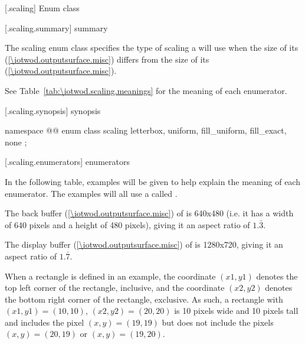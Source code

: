  [\iotwod.scaling] {Enum class }

 [\iotwod.scaling.summary] { summary}

\pnum
The scaling enum class specifies the type of scaling a  
will use when the size of its  (\ref{\iotwod.outputsurface.misc}) differs from the size of its  (\ref{\iotwod.outputsurface.misc}).

\pnum
See Table~\ref{tab:\iotwod.scaling.meanings} for the meaning of each  enumerator.

 [\iotwod.scaling.synopsis] { synopsis}

\begin{codeblock}
namespace @\fullnamespace{}@ {
  enum class scaling {
    letterbox,
    uniform,
    fill_uniform,
    fill_exact,
    none
  };
}
\end{codeblock}

 [\iotwod.scaling.enumerators] { enumerators}

\pnum
\begin{note}
In the following table, examples will be given to help explain the meaning of each enumerator. The examples will all use a  called .

The back buffer (\ref{\iotwod.outputsurface.misc}) of  is 640x480 (i.e. it has a width of 640 pixels and a height of 480 pixels), giving it an aspect ratio of $1.\bar{3}$.

The display buffer (\ref{\iotwod.outputsurface.misc}) of  is 1280x720, giving it an aspect ratio of $1.\bar{7}$.

When a rectangle is defined in an example, the coordinate $(x1,y1)$ denotes the top left corner of the rectangle, inclusive, and the coordinate $(x2,y2)$ denotes the bottom right corner of the rectangle, exclusive. As such, a rectangle with $(x1,y1) = (10,10)$, $(x2,y2) = (20, 20)$ is 10 pixels wide and 10 pixels tall and includes the pixel $(x,y) = (19,19)$ but does not include the pixels $(x,y) = (20,19)$ or $(x,y) = (19,20)$.
\end{note}

